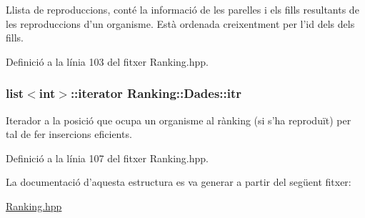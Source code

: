 Llista de reproduccions, conté la informació de les parelles i els fills resultants de les reproduccions d'un organisme. Està ordenada creixentment per l'id dels dels fills. 



Definició a la línia 103 del fitxer Ranking.\-hpp.

\hypertarget{struct_ranking_1_1_dades_ad6eba4c911d6b7feb63b237613e59436}{
\subsubsection[{itr}]{\setlength{\rightskip}{0pt plus 5cm}list$<$int$>$\-::iterator Ranking\-::\-Dades\-::itr}}\label{struct_ranking_1_1_dades_ad6eba4c911d6b7feb63b237613e59436}


Iterador a la posició que ocupa un organisme al rànking (si s'ha reproduït) per tal de fer insercions eficients. 



Definició a la línia 107 del fitxer Ranking.\-hpp.



La documentació d'aquesta estructura es va generar a partir del següent fitxer\-:\begin{DoxyCompactItemize}
\item 
\hyperlink{_ranking_8hpp}{Ranking.\-hpp}\end{DoxyCompactItemize}
